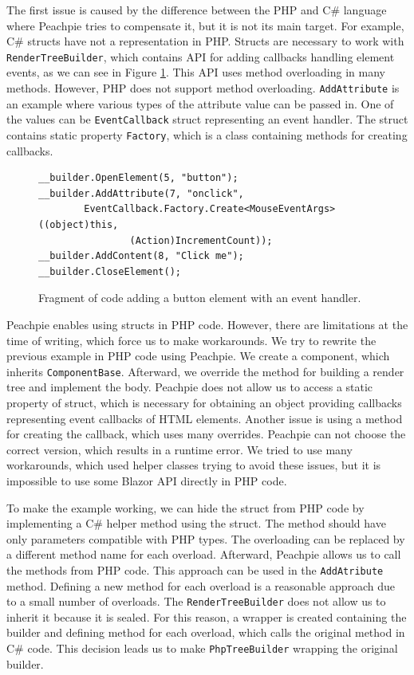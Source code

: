 The first issue is caused by the difference between the PHP and C\# language where Peachpie tries to compensate it, but it is not its main target. 
For example, C\# structs have not a representation in PHP.
Structs are necessary to work with \texttt{RenderTreeBuilder}, which contains API for adding callbacks handling element events, as we can see in Figure \ref{img14:callback}.
This API uses method overloading in many methods.
However, PHP does not support method overloading.
\texttt{AddAttribute} is an example where various types of the attribute value can be passed in.
One of the values can be \texttt{EventCallback} struct representing an event handler.
The struct contains static property \texttt{Factory}, which is a class containing methods for creating callbacks.
\par
\begin{figure}[b!]
\begin{lstlisting}
__builder.OpenElement(5, "button");
__builder.AddAttribute(7, "onclick", 
		EventCallback.Factory.Create<MouseEventArgs>((object)this, 
				(Action)IncrementCount));
__builder.AddContent(8, "Click me");
__builder.CloseElement();
\end{lstlisting}
\caption{Fragment of code adding a button element with an event handler.}
\label{img14:callback}
\end{figure}
\par
Peachpie enables using structs in PHP code. 
However, there are limitations at the time of writing, which force us to make workarounds.
We try to rewrite the previous example in PHP code using Peachpie.
We create a component, which inherits \texttt{ComponentBase}. 
Afterward, we override the method for building a render tree and implement the body.
Peachpie does not allow us to access a static property of struct, which is necessary for obtaining an object providing callbacks representing event callbacks of HTML elements.
Another issue is using a method for creating the callback, which uses many overrides.
Peachpie can not choose the correct version, which results in a runtime error.
We tried to use many workarounds, which used helper classes trying to avoid these issues, but it is impossible to use some Blazor API directly in PHP code.
\par
To make the example working, we can hide the struct from PHP code by implementing a C\# helper method using the struct.
The method should have only parameters compatible with PHP types. 
The overloading can be replaced by a different method name for each overload.
Afterward, Peachpie allows us to call the methods from PHP code.
This approach can be used in the \texttt{AddAtribute} method. 
Defining a new method for each overload is a reasonable approach due to a small number of overloads.
The \texttt{RenderTreeBuilder} does not allow us to inherit it because it is sealed.
For this reason, a wrapper is created containing the builder and defining method for each overload, which calls the original method in C\# code.
This decision leads us to make \texttt{PhpTreeBuilder} wrapping the original builder.

